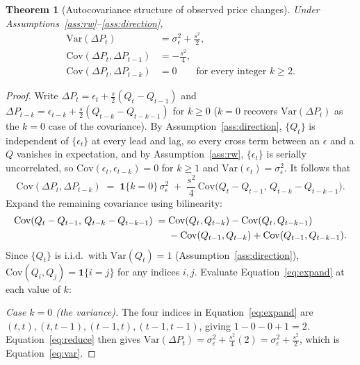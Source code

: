 \documentclass[11pt]{article}
\newtheorem{theorem}{Theorem}
\theoremstyle{remark}
\theoremstyle{definition}
\begin{document}
\begin{theorem}[Autocovariance structure of observed price changes]
\label{thm:autocov}
Under Assumptions~\ref{ass:rw}--\ref{ass:direction},
\begin{align}
\mathrm{Var}(\Delta P_t) &= \sigma_\epsilon^2 + \frac{s^2}{2}, \label{eq:var} \\
\mathrm{Cov}(\Delta P_t, \Delta P_{t-1}) &= -\frac{s^2}{4}, \label{eq:cov1} \\
\mathrm{Cov}(\Delta P_t, \Delta P_{t-k}) &= 0 \qquad \text{for every integer } k\ge 2. \label{eq:cov2}
\end{align}
\end{theorem}
\begin{proof}
Write $\Delta P_t = \epsilon_t + \tfrac{s}{2}(Q_t-Q_{t-1})$ and $\Delta P_{t-k} = \epsilon_{t-k} + \tfrac{s}{2}(Q_{t-k}-Q_{t-k-1})$ for $k\ge0$ ($k=0$ recovers $\mathrm{Var}(\Delta P_t)$ as the $k=0$ case of the covariance). By Assumption~\ref{ass:direction}, $\{Q_t\}$ is independent of $\{\epsilon_t\}$ at every lead and lag, so every cross term between an $\epsilon$ and a $Q$ vanishes in expectation, and by Assumption~\ref{ass:rw}, $\{\epsilon_t\}$ is serially uncorrelated, so $\mathrm{Cov}(\epsilon_t,\epsilon_{t-k})=0$ for $k\ge1$ and $\mathrm{Var}(\epsilon_t)=\sigma_\epsilon^2$. It follows that
\begin{equation}
\mathrm{Cov}(\Delta P_t,\Delta P_{t-k}) \;=\; \mathbf{1}\{k=0\}\,\sigma_\epsilon^2 \;+\; \frac{s^2}{4}\,\mathrm{Cov}\big(Q_t-Q_{t-1},\,Q_{t-k}-Q_{t-k-1}\big).
\label{eq:reduce}
\end{equation}
Expand the remaining covariance using bilinearity:
\begin{align}
\mathrm{Cov}(Q_t-Q_{t-1},\,Q_{t-k}-Q_{t-k-1}) \;=\;& \mathrm{Cov}(Q_t,Q_{t-k}) - \mathrm{Cov}(Q_t,Q_{t-k-1}) \notag \\
&- \mathrm{Cov}(Q_{t-1},Q_{t-k}) + \mathrm{Cov}(Q_{t-1},Q_{t-k-1}).
\label{eq:expand}
\end{align}
Since $\{Q_t\}$ is i.i.d.\ with $\mathrm{Var}(Q_t)=1$ (Assumption~\ref{ass:direction}), $\mathrm{Cov}(Q_i,Q_j) = \mathbf{1}\{i=j\}$ for any indices $i,j$. Evaluate Equation~\eqref{eq:expand} at each value of $k$:

\emph{Case $k=0$ (the variance).} The four indices in Equation~\eqref{eq:expand} are $(t,t),(t,t-1),(t-1,t),(t-1,t-1)$, giving $1 - 0 - 0 + 1 = 2$. Equation~\eqref{eq:reduce} then gives $\mathrm{Var}(\Delta P_t) = \sigma_\epsilon^2 + \tfrac{s^2}{4}(2) = \sigma_\epsilon^2 + \tfrac{s^2}{2}$, which is Equation~\eqref{eq:var}.


\end{proof}
\end{document}
